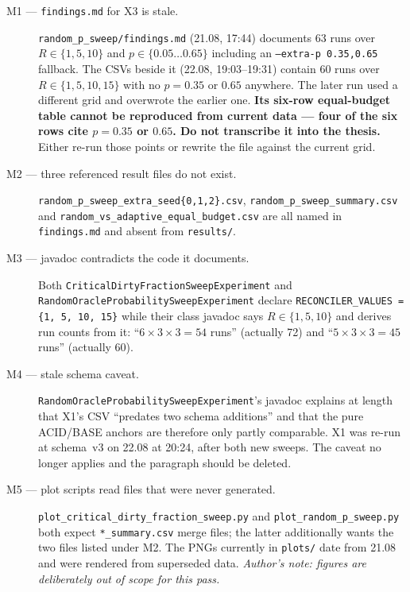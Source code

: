 \begin{description}

\item[M1 --- \texttt{findings.md} for X3 is stale.]
\texttt{random\_p\_sweep/findings.md} (21.08, 17:44) documents 63 runs
over $R \in \{1,5,10\}$ and $p \in \{0.05 \dots 0.65\}$ including an
\texttt{--extra-p 0.35,0.65} fallback. The CSVs beside it (22.08,
19:03--19:31) contain 60 runs over $R \in \{1,5,10,15\}$ with no $p =
0.35$ or $0.65$ anywhere. The later run used a different grid and
overwrote the earlier one. \textbf{Its six-row equal-budget table cannot
be reproduced from current data --- four of the six rows cite $p = 0.35$
or $0.65$. Do not transcribe it into the thesis.} Either re-run those
points or rewrite the file against the current grid.

\item[M2 --- three referenced result files do not exist.]
\texttt{random\_p\_sweep\_extra\_seed\{0,1,2\}.csv},
\texttt{random\_p\_sweep\_summary.csv} and
\texttt{random\_vs\_adaptive\_equal\_budget.csv} are all named in
\texttt{findings.md} and absent from \texttt{results/}.

\item[M3 --- javadoc contradicts the code it documents.] Both
\texttt{CriticalDirtyFractionSweepExperiment} and
\texttt{RandomOracleProbabilitySweepExperiment} declare
\texttt{RECONCILER\_VALUES = \{1, 5, 10, 15\}} while their class javadoc
says $R \in \{1, 5, 10\}$ and derives run counts from it: ``$6 \times 3
\times 3 = 54$ runs'' (actually 72) and ``$5 \times 3 \times 3 = 45$
runs'' (actually 60).

\item[M4 --- stale schema caveat.]
\texttt{RandomOracleProbabilitySweepExperiment}'s javadoc explains at
length that X1's CSV ``predates two schema additions'' and that the pure
ACID/BASE anchors are therefore only partly comparable. X1 was re-run at
schema~v3 on 22.08 at 20:24, after both new sweeps. The caveat no longer
applies and the paragraph should be deleted.

\item[M5 --- plot scripts read files that were never generated.]
\texttt{plot\_critical\_dirty\_fraction\_sweep.py} and
\texttt{plot\_random\_p\_sweep.py} both expect \texttt{*\_summary.csv}
merge files; the latter additionally wants the two files listed under M2.
The PNGs currently in \texttt{plots/} date from 21.08 and were rendered
from superseded data. \emph{Author's note: figures are deliberately out
of scope for this pass.}


\end{description}
